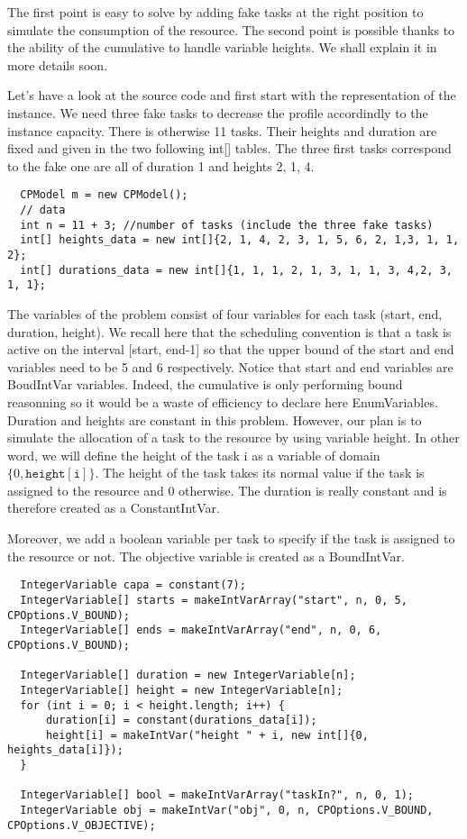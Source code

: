 The first point is easy to solve by adding fake tasks at the right position to simulate the consumption of the resource. The second point is possible thanks to the ability of the cumulative to handle variable heights. We shall explain it in more details soon.

Let's have a look at the source code and first start with the representation of the instance. We need three fake tasks to decrease the profile accordindly to the instance capacity. There is otherwise 11 tasks. Their heights and duration are fixed and given in the two following int[] tables. The three first tasks correspond to the fake one are all of duration 1 and heights 2, 1, 4. 
\begin{lstlisting}
  CPModel m = new CPModel();
  // data
  int n = 11 + 3; //number of tasks (include the three fake tasks)
  int[] heights_data = new int[]{2, 1, 4, 2, 3, 1, 5, 6, 2, 1,3, 1, 1, 2};
  int[] durations_data = new int[]{1, 1, 1, 2, 1, 3, 1, 1, 3, 4,2, 3, 1, 1};
\end{lstlisting}

The variables of the problem consist of four variables for each task (start, end, duration, height). We recall here that the scheduling convention is that a task is active on the interval [start, end-1] so that the upper bound of the start and end variables need to be 5 and 6 respectively. Notice that start and end variables are BoudIntVar variables. Indeed, the cumulative is only performing bound reasonning so it would be a waste of efficiency to declare here EnumVariables. Duration and heights are constant in this problem. However, our plan is to simulate the allocation of a task to the resource by using variable height. In other word, we will define the height of the task i as a variable of domain $\{0, \mathtt{height[i]}\}$. The height of the task takes its normal value if the task is assigned to the resource and 0 otherwise. The duration is really constant and is therefore created as a ConstantIntVar.

Moreover, we add a boolean variable per task to specify if the task is assigned to the resource or not. The objective variable is created as a BoundIntVar. 

\begin{lstlisting}
  IntegerVariable capa = constant(7);
  IntegerVariable[] starts = makeIntVarArray("start", n, 0, 5, CPOptions.V_BOUND);
  IntegerVariable[] ends = makeIntVarArray("end", n, 0, 6, CPOptions.V_BOUND);
  
  IntegerVariable[] duration = new IntegerVariable[n];
  IntegerVariable[] height = new IntegerVariable[n];
  for (int i = 0; i < height.length; i++) {
      duration[i] = constant(durations_data[i]);
      height[i] = makeIntVar("height " + i, new int[]{0, heights_data[i]});
  }
  
  IntegerVariable[] bool = makeIntVarArray("taskIn?", n, 0, 1);
  IntegerVariable obj = makeIntVar("obj", 0, n, CPOptions.V_BOUND, CPOptions.V_OBJECTIVE);
\end{lstlisting}

